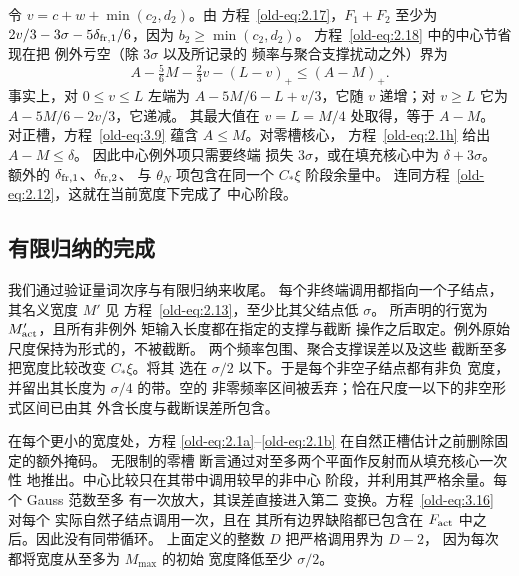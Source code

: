 令 \(v=c+w+\min(c_2,d_2)\)。由
方程~\eqref{old-eq:2.17}，\(F_1+F_2\) 至少为
\(2v/3-3\sigma-5\delta_{{\rm fr},1}/6\)，因为
\(b_2\ge\min(c_2,d_2)\)。
方程~\eqref{old-eq:2.18} 中的中心节省现在把
例外亏空（除 \(3\sigma\) 以及所记录的
频率与聚合支撑扰动之外）界为
\begin{equation}
 A-\tfrac56M-\tfrac23v-(L-v)_+
 \le (A-M)_+.
 \label{old-eq:2.19}
\end{equation}
事实上，对 \(0\le v\le L\) 左端为
\(A-5M/6-L+v/3\)，它随 \(v\) 递增；对
\(v\ge L\) 它为 \(A-5M/6-2v/3\)，它递减。
其最大值在 \(v=L=M/4\) 处取得，等于 \(A-M\)。
对正槽，方程~\eqref{old-eq:3.9} 蕴含
\(A\le M\)。对零槽核心，
方程~\eqref{old-eq:2.1h} 给出 \(A-M\le\delta\)。
因此中心例外项只需要终端
损失 \(3\sigma\)，或在填充核心中为 \(\delta+3\sigma\)。
额外的 \(\delta_{{\rm fr},1}\)、\(\delta_{{\rm fr},2}\)、
与 \(\theta_N\) 项包含在同一个 \(C_*\xi\)
阶段余量中。
连同方程~\eqref{old-eq:2.12}，这就在当前宽度下完成了
中心阶段。

\subsection{有限归纳的完成}

我们通过验证量词次序与有限归纳来收尾。
每个非终端调用都指向一个子结点，其名义宽度 \(M'\) 见
方程~\eqref{old-eq:2.13}，至少比其父结点低 \(\sigma\)。
所声明的行宽为 \(M'_{\rm act}\)，且所有非例外
矩输入长度都在指定的支撑与截断
操作之后取定。例外原始尺度保持为形式的，不被截断。
两个频率包围、聚合支撑误差以及这些
截断至多把宽度比较改变 \(C_*\xi\)。将其
选在 \(\sigma/2\) 以下。于是每个非空子结点都有非负
宽度，并留出其长度为 \(\sigma/4\) 的带。空的
非零频率区间被丢弃；恰在尺度一以下的非空形式区间已由其
外含长度与截断误差所包含。

在每个更小的宽度处，方程
\eqref{old-eq:2.1a}--\eqref{old-eq:2.1b} 在自然正槽估计之前删除固定的额外掩码。
无限制的零槽
断言通过对至多两个平面作反射而从填充核心一次性
地推出。中心比较只在其带中调用较早的非中心
阶段，并利用其严格余量。每个 Gauss 范数至多
有一次放大，其误差直接进入第二
变换。方程~\eqref{old-eq:3.16} 对每个
实际自然子结点调用一次，且在
其所有边界缺陷都已包含在 \(F_{\rm act}\) 中之后。因此没有同带循环。
上面定义的整数 \(D\) 把严格调用界为 \(D-2\)，
因为每次都将宽度从至多为 \(M_{\max}\) 的初始
宽度降低至少 \(\sigma/2\)。

